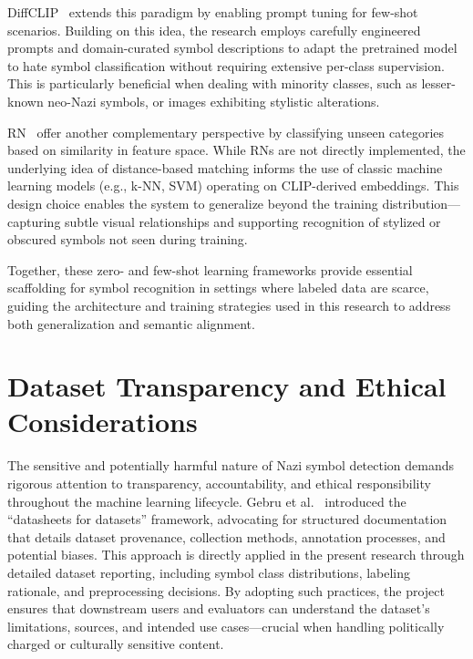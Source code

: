 DiffCLIP~\parencite{zhang2021language} extends this paradigm by enabling prompt tuning for few-shot scenarios.
Building on this idea, the research employs carefully engineered prompts and domain-curated symbol descriptions to
adapt the pretrained model to hate symbol classification without requiring extensive per-class supervision. This is
particularly beneficial when dealing with minority classes, such as lesser-known neo-Nazi symbols, or images
exhibiting stylistic alterations.

\ac{RN}~\parencite{sung2018learning} offer another complementary perspective by classifying unseen
categories based on similarity in feature space. While RNs are not directly implemented, the underlying idea of
distance-based matching informs the use of classic machine learning models (e.g., k-NN, SVM) operating on
CLIP-derived embeddings. This design choice enables the system to generalize beyond the training
distribution—capturing subtle visual relationships and supporting recognition of stylized or obscured symbols not
seen during training.

Together, these zero- and few-shot learning frameworks provide essential scaffolding for symbol recognition in
settings where labeled data are scarce, guiding the architecture and training strategies used in this research to
address both generalization and semantic alignment.

\section{Dataset Transparency and Ethical Considerations}

The sensitive and potentially harmful nature of Nazi symbol detection demands rigorous attention to transparency,
accountability, and ethical responsibility throughout the machine learning lifecycle. Gebru et al.~
\parencite{gebru2021datasheets} introduced the “datasheets for datasets” framework, advocating for structured
documentation that details dataset provenance, collection methods, annotation processes, and potential biases. This
approach is directly applied in the present research through detailed dataset reporting, including symbol class
distributions, labeling rationale, and preprocessing decisions. By adopting such practices, the project ensures that
downstream users and evaluators can understand the dataset’s limitations, sources, and intended use cases—crucial
when handling politically charged or culturally sensitive content.

